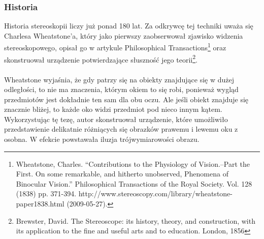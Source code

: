\subsubsection{Historia} 
Historia stereoskopii liczy już ponad 180 lat. Za odkrywcę tej techniki uważa się Charlesa Wheatstone'a, który jako pierwszy zaobserwował zjawisko widzenia stereoskopowego, opisał go w artykule Philosophical Transactions\footnote{Wheatstone, Charles. “Contributions to the Physiology of Vision.–Part the First. On some remarkable, and hitherto unobserved, Phenomena of Binocular Vision.” Philosophical Transactions of the Royal Society. Vol. 128 (1838) pp. 371-394. http://www.stereoscopy.com/library/wheatstone-paper1838.html (2009-05-27).} oraz skonstruował urządzenie potwierdzające słuszność jego teorii\footnote{Brewster, David. The Stereoscope: its history, theory, and construction, with its application to the fine and useful arts and to education. London, 1856}. 
\paragraph{} Wheatstone wyjaśnia, że gdy patrzy się na obiekty znajdujące się w dużej odległości, to nie ma znaczenia, którym okiem to się robi, ponieważ wygląd przedmiotów jest dokładnie ten sam dla obu oczu. Ale jeśli obiekt znajduje się znacznie bliżej, to każde oko widzi przedmiot pod nieco innym kątem. Wykorzystując tę tezę, autor skonstruował urządzenie, które umożliwiło przedstawienie delikatnie różniących się obrazków prawemu i lewemu oku z osobna. W efekcie powstawała iluzja trójwymiarowości obrazu.
  
